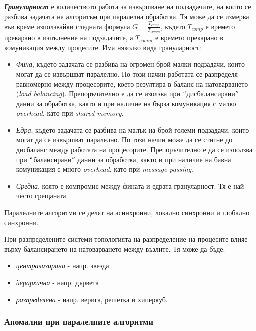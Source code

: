 \documentclass[fleqn,12pt]{article}
\begin{document}
\textbf{\textit{Грануларност}} е количеството работа за извършване на подзадачите, на които се разбива задачата на алгоритъм при паралелна обработка.
Тя може да се измерва във време използвайки следната формула $G = \frac{T_{comp}}{T_{comm}}$, където $T_{comp}$ е времето прекарано в изпълнение на подзадачите, а $T_{comm}$ е времето прекарано в комуникация между процесите.
Има няколко вида грануларност:
\begin{itemize}
    \item \textit{Фина}, където задачата се разбива на огромен брой малки подзадачи, които могат да се извършват паралелно.
    По този начин работата се разпределя равномерно между процесорите, което резултира в баланс на натоварването (\textit{load balancing}).
    Препоръчително е да се изолзва при $``$дисбалансирани$''$ данни за обработка, както и при наличие на бърза комуникация с малко \textit{overhead}, като при \textit{shared memory}.
    \item \textit{Едра}, където задачата се разбива на малък на брой големи подзадачи, които могат да се извършват паралелно.
    По този начин може да се стигне до дисбаланс между работата на процесорите.
    Препоръчително е да се използва при $``$балансирани$''$ данни за обработка, както и при наличие на бавна комуникация с много \textit{overhead}, като при \textit{message passing}.
    \item \textit{Средна}, която е компромис между фината и едрата грануларност.
    Тя е най-често срещаната.
\end{itemize}
\bigbreak

Паралелните алгоритми се делят на асинхронни, локално синхронни и глобално синхронни.
\bigbreak

При разпределените системи топологията на разпределение на процесите влияе върху балансирането на натоварването между възлите. Тя може да бъде:
\begin{itemize}
    \item \textit{централизирана} - напр. звезда.
    \item \textit{йерархична} - напр. дървета
    \item \textit{разпределена} - напр. верига, решетка и хиперкуб.
\end{itemize}

\subsubsection{Аномалии при паралелните алгоритми}
\end{document}
